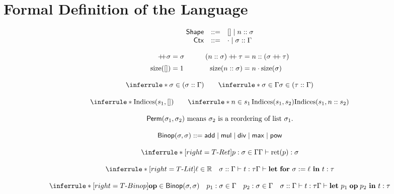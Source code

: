 
\chapter{Formal Definition of the Language}
\[
    \begin{array}{rcl}
        \mathsf{Shape} & \mathrel{::=} & [] \mid n :: \sigma         \\
        \mathsf{Ctx}   & \mathrel{::=} & \cdot \mid \sigma :: \Gamma
    \end{array}
\]

\[
    \begin{aligned}
        [] \append \sigma      & = \sigma
                               & \qquad
        (n::\sigma)\append\tau & = n::(\sigma\append\tau)
        \\[2pt]
        \size([])              & = 1
                               & \qquad
        \size(n::\sigma)       & = n \cdot \size(\sigma)
    \end{aligned}
\]

\[
    \inferrule*{ }{\sigma \mem (\sigma::\Gamma)}
    \qquad
    \inferrule*{\sigma \mem \Gamma}{\sigma \mem (\tau::\Gamma)}
\]

\[
    \inferrule*{ }{\Indices(s_1,[])}
    \qquad
    \inferrule*{n \mem s_1 \\ \Indices(s_1,s_2)}{\Indices(s_1, n::s_2)}
\]

\[
    \mathsf{Perm}(\sigma_1,\sigma_2) \text{ means $\sigma_2$ is a reordering of list $\sigma_1$.}
\]

\[
    \mathsf{Binop}(\sigma,\sigma) \mathrel{::=} \mathsf{add}\mid\mathsf{mul}\mid\mathsf{div}\mid\mathsf{max}\mid\mathsf{pow}
\]


\[
    \inferrule*[right=T\text{-}Ret]{p : \sigma \mem \Gamma}{\judg{\Gamma}{\operatorname{ret}(p)}{\sigma}}
\]

\[
    \inferrule*[right=T\text{-}Lit]{\ell \in \Float \quad \judg{\sigma::\Gamma}{t}{\tau}}
    {\judg{\Gamma}{\mathbf{let\ for}\ \sigma := \ell\ \mathbf{in}\ t}{\tau}}
\]

\[
    \inferrule*[right=T\text{-}Binop]{\mathbf{op}\in \Binop(\sigma,\sigma) \quad p_1:\sigma\mem\Gamma \quad p_2:\sigma\mem\Gamma \quad
        \judg{\sigma::\Gamma}{t}{\tau}}
    {\judg{\Gamma}{\mathbf{let}\ p_1\;\mathbf{op}\;p_2\ \mathbf{in}\ t}{\tau}}
\]

